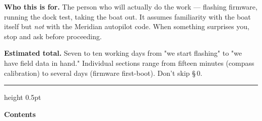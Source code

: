 \documentclass[10pt,a4paper]{article}
\begin{document}
\pagestyle{empty}


\vspace{54mm}

{\sffamily\color{mInk}\small{}
\textbf{Who this is for.} The person who will actually do the work --- flashing firmware, running the dock test, taking the boat out. It assumes familiarity with the boat itself but \emph{not} with the Meridian autopilot code. When something surprises you, stop and ask before proceeding.\par

\vspace{6pt}

\textbf{Estimated total.} Seven to ten working days from "we start flashing" to "we have field data in hand." Individual sections range from fifteen minutes (compass calibration) to several days (firmware first-boot). Don't skip §\,0.
}

\vspace{10pt}
{\color{mRule}\hrule height 0.5pt}
\vspace{10pt}

{\sffamily\large\bfseries\color{mCyanDark}Contents}
\vspace{2pt}

\begingroup
  \renewcommand{\contentsname}{}
  \tableofcontents
\endgroup

\vspace{12pt}
\end{document}
